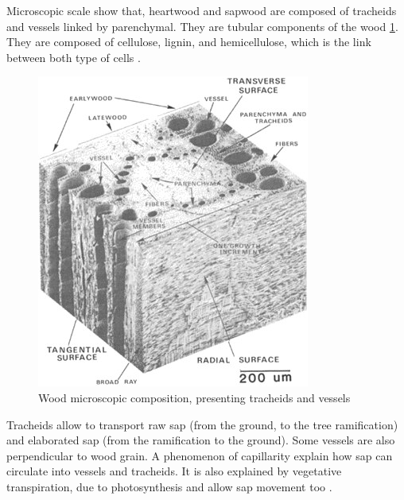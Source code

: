 Microscopic scale show that, heartwood and sapwood are composed of tracheids and vessels linked by parenchymal. They are tubular components of the wood \ref{fig:Fig1}. They are composed of cellulose, lignin, and hemicellulose, which is the link between both type of cells \parencite{Reference1}.
\begin{figure}[th]
	\centering
	\includegraphics{Figures/Tracheids}
	\decoRule
	\caption[Wood microscopic composition]{Wood microscopic composition, presenting tracheids and vessels}
	\label{fig:Fig1}
\end{figure}
Tracheids allow to transport raw sap (from the ground, to the tree ramification) and elaborated sap (from the ramification to the ground). Some vessels are also perpendicular to wood grain. A phenomenon of capillarity explain how sap can circulate into vessels and tracheids. It is also explained by vegetative transpiration, due to photosynthesis and allow sap movement too \parencite{Reference1}.

